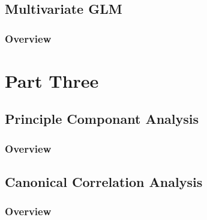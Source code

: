 \documentclass[11pt,fleqn]{book} %
\begin{document}

\chapter{Multivariate GLM}

\section{Overview}



 \part{Part Three}



\chapter{Principle Componant Analysis}

\section{Overview}



\chapter{Canonical Correlation Analysis}

\section{Overview}
\end{document}
